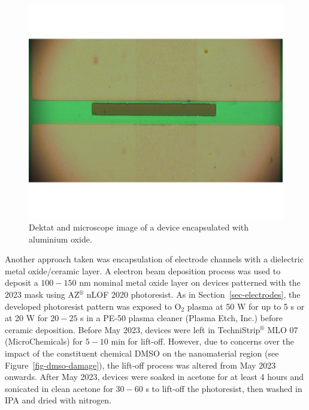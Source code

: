 \documentclass[
  letterpaper,
  DIV=11,
  numbers=noendperiod]{scrartcl}
\begin{document}
\begin{figure}
\begin{minipage}[t]{0.47\linewidth}
{{\includegraphics{figures/ch4/al2o3_encapsulation.png}

}

}

\end{minipage}%

\caption{\label{fig-dektat-dielectric-layer}Dektat and microscope image
of a device encapsulated with aluminium oxide.}

\end{figure}

Another approach taken was encapsulation of electrode channels with a
dielectric metal oxide/ceramic layer. A electron beam deposition process
was used to deposit a \(100-150\) nm nominal metal oxide layer on
devices patterned with the 2023 mask using AZ\(^\circledR\) nLOF 2020
photoresist. As in Section~\ref{sec-electrodes}, the developed
photoresist pattern was exposed to O\(_2\) plasma at 50 W for up to 5 s
or at 20 W for \(20-25\) s in a PE-50 plasma cleaner (Plasma Etch, Inc.)
before ceramic deposition. Before May 2023, devices were left in
TechniStrip\(^\circledR\) MLO 07 (MicroChemicals) for \(5-10\) min for
lift-off. However, due to concerns over the impact of the constituent
chemical DMSO on the nanomaterial region (see
Figure~\ref{fig-dmso-damage}), the lift-off process was altered from May
2023 onwards. After May 2023, devices were soaked in acetone for at
least 4 hours and sonicated in clean acetone for \(30-60\) s to lift-off
the photoresist, then washed in IPA and dried with nitrogen.
\end{document}
